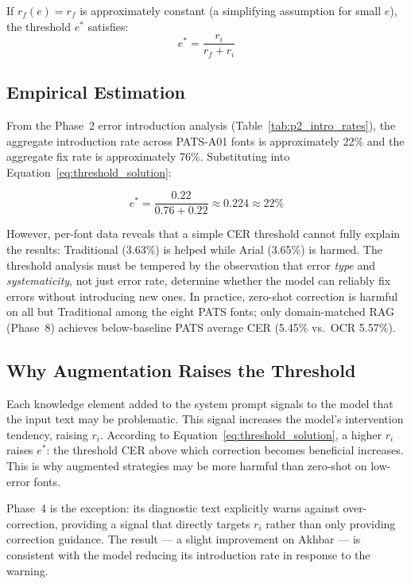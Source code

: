 If $r_f(e) = r_f$ is approximately constant (a simplifying assumption for
small $e$), the threshold $e^*$ satisfies:
\begin{equation}\label{eq:threshold_solution}
  e^* = \frac{r_i}{r_f + r_i}
\end{equation}

\subsection{Empirical Estimation}
\label{subsec:disc_oc_empirical}

From the Phase~2 error introduction analysis (Table~\ref{tab:p2_intro_rates}),
the aggregate introduction rate across PATS-A01 fonts is approximately 22\%
and the aggregate fix rate is approximately 76\%. Substituting into
Equation~\ref{eq:threshold_solution}:

\begin{equation}
  e^* = \frac{0.22}{0.76 + 0.22} \approx 0.224 \approx 22\%
\end{equation}

However, per-font data reveals that a simple CER threshold cannot fully
explain the results: Traditional (3.63\%) is helped while Arial (3.65\%) is
harmed. The threshold analysis must be tempered by the observation that
error \emph{type} and \emph{systematicity}, not just error rate, determine
whether the model can reliably fix errors without introducing new ones. In
practice, zero-shot correction is harmful on all but Traditional among the
eight PATS fonts; only domain-matched RAG (Phase~8) achieves below-baseline
PATS average CER (5.45\% vs.\ OCR 5.57\%).

\subsection{Why Augmentation Raises the Threshold}
\label{subsec:disc_oc_augmentation}

Each knowledge element added to the system prompt signals to the model that
the input text may be problematic. This signal increases the model's
intervention tendency, raising $r_i$. According to Equation~\ref{eq:threshold_solution},
a higher $r_i$ raises $e^*$: the threshold CER above which correction
becomes beneficial increases. This is why augmented strategies may be more
harmful than zero-shot on low-error fonts.

Phase~4 is the exception: its diagnostic text explicitly warns against
over-correction, providing a signal that directly targets $r_i$ rather than
only providing correction guidance. The result --- a slight improvement on
Akhbar --- is consistent with the model reducing its introduction rate in
response to the warning.

